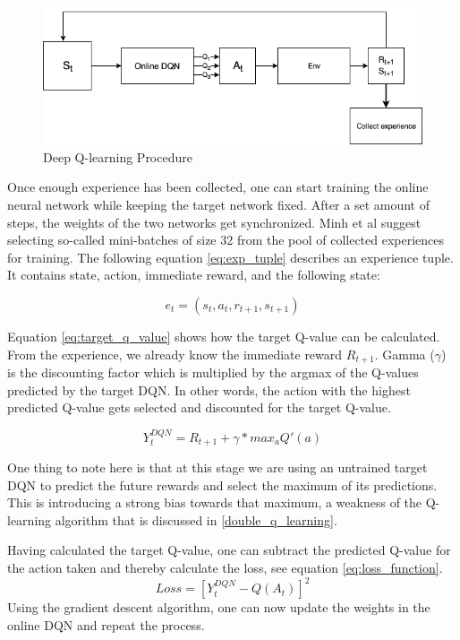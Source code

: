 \documentclass[12pt,a4paper]{article}
\begin{document}
\begin{figure}
    \centering
    \includegraphics[width=0.8\linewidth]{Figures/QLearningProcedure.png}
    \caption{Deep Q-learning Procedure}
    \label{fig:dql_procedure}
\end{figure}
Once enough experience has been collected, one can start training the online neural network while keeping the target network fixed. After a set amount of steps, the weights of the two networks get synchronized. Minh et al \cite{Mnih2016} suggest selecting so-called mini-batches of size 32 from the pool of collected experiences for training. The following equation \ref{eq:exp_tuple} describes an experience tuple. It contains state, action, immediate reward, and the following state:

\begin{equation}
    \label{eq:exp_tuple}
    e_t = (s_t, a_t, r_{t+1}, s_{t+1})
\end{equation}

Equation \ref{eq:target_q_value} shows how the target Q-value can be calculated. From the experience, we already know the immediate reward $R_{t+1}$. Gamma ($\gamma$) is the discounting factor which is multiplied by the argmax of the Q-values predicted by the target DQN. In other words, the action with the highest predicted Q-value gets selected and discounted for the target Q-value.

\begin{equation}
    \label{eq:target_q_value}
    Y_t^{DQN} = R_{t+1} + \gamma * max_aQ'(a)
\end{equation}

One thing to note here is that at this stage we are using an untrained target DQN to predict the future rewards and select the maximum of its predictions. This is introducing a strong bias towards that maximum, a weakness of the Q-learning algorithm that is discussed in \ref{double_q_learning}. 

Having calculated the target Q-value, one can subtract the predicted Q-value for the action taken and thereby calculate the loss, see equation \ref{eq:loss_function}.
\begin{equation}
    \label{eq:loss_function}
    Loss = [Y_t^{DQN} - Q(A_t)]^2
\end{equation}
Using the gradient descent algorithm, one can now update the weights in the online DQN and repeat the process.
\end{document}
